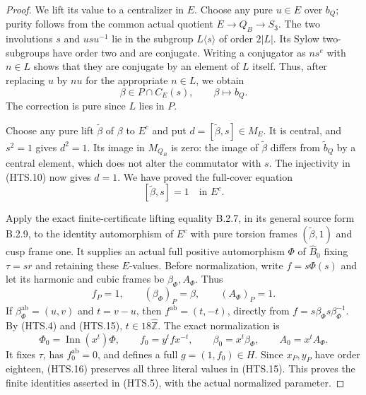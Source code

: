 \begin{proof}
We lift its value to a centralizer in $E$.  Choose
any pure $u\in E$ over $b_Q$; purity follows from
the common actual quotient $E\to Q_B\to S_3$.
The two involutions $s$ and $usu^{-1}$ lie in the
subgroup $L\langle s\rangle$ of order $2|L|$.
Its Sylow two-subgroups have order two and are
conjugate.  Writing a conjugator as $ns^e$ with
$n\in L$ shows that they are conjugate by an
element of $L$ itself.  Thus, after replacing $u$
by $nu$ for the appropriate $n\in L$, we obtain
\[
               \beta\in P\cap C_E(s),
               \qquad \beta\longmapsto b_Q.
 \tag{HTS.13}
\]
The correction is pure since $L$ lies in $P$.

Choose any pure lift $\widetilde\beta$ of $\beta$
to $E^c$ and put
$d=[\widetilde\beta,s]\in M_E$.
It is central, and $s^2=1$ gives $d^2=1$.
Its image in $M_{Q_B}$ is zero: the image of
$\widetilde\beta$ differs from $\widetilde b_Q$
by a central element, which does not alter the
commutator with $s$.  The injectivity in (HTS.10)
now gives $d=1$.  We have proved the full-cover
equation
\[
                         [\widetilde\beta,s]=1
                         \quad\text{in }E^c .
 \tag{HTS.14}
\]

Apply the exact finite-certificate lifting equality
B.2.7, in its general source form B.2.9, to the
identity automorphism of $E^c$ with pure torsion
frames $(\widetilde\beta,1)$ and cusp frame one.
It supplies an actual full positive automorphism
$\Phi$ of $\widehat B_0$ fixing $\tau=sr$ and
retaining these $E$-values.  Before normalization,
write $f=s\Phi(s)$ and let its harmonic and cubic
frames be $\beta_\Phi,A_\Phi$.  Thus
\[
       f_P=1,\qquad (\beta_\Phi)_P=\beta,
                   \qquad(A_\Phi)_P=1.
 \tag{HTS.15}
\]
If $\beta_\Phi^{\mathrm{ab}}=(u,v)$ and $t=v-u$,
then $f^{\mathrm{ab}}=(t,-t)$, directly from
$f=s\beta_\Phi s\beta_\Phi^{-1}$.
By (HTS.4) and (HTS.15), $t\in18\widehat{\mathbb Z}$.
The exact normalization is
\[
 \Phi_0=\operatorname{Inn}(x^t)\Phi,
 \qquad f_0=y^t f x^{-t},\qquad
 \beta_0=x^t\beta_\Phi,
 \qquad A_0=x^t A_\Phi.
 \tag{HTS.16}
\]
It fixes $\tau$, has $f_0^{\mathrm{ab}}=0$, and
defines a full $g=(1,f_0)\in H$.
Since $x_P,y_P$ have order eighteen, (HTS.16)
preserves all three literal values in (HTS.15).
This proves the finite identities asserted in
(HTS.5), with the actual normalized parameter.


\end{proof}
